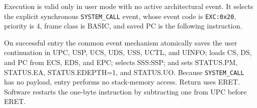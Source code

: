Execution is valid only in user mode with no active architectural event. It selects the explicit synchronous \texttt{SYSTEM\_CALL} event, whose event code is \texttt{EXC:0x20}, priority is 4, frame class is BASIC, and saved PC is the following instruction.

On successful entry the common event mechanism atomically saves the user continuation in UPC, USP, UCS, UDS, USS, UCTL, and UINFO; loads CS, DS, and PC from ECS, EDS, and EPC; selects SSS:SSP; and sets STATUS.PM, STATUS.EA, STATUS.EDEPTH=1, and STATUS.UO. Because \texttt{SYSTEM\_CALL} has no payload, entry performs no stack-memory access. Return uses ERET. Software restarts the one-byte instruction by subtracting one from UPC before ERET.
